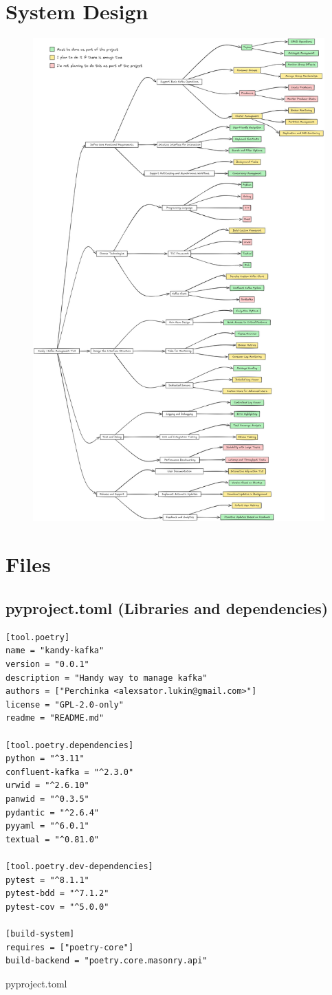 \documentclass[10pt , a4paper]{report}
\begin{document}
\chapter{System Design}\label{appendix:system_design}
\begin{figure}[htpb]
    \centering
    \includegraphics[width=0.7\linewidth]{imgs/SystemDesign.png}
\end{figure}

\chapter{Files}
\section{pyproject.toml (Libraries and dependencies)}\label{appendix:libs}
\begin{listing}[htbp]
    \begin{verbatim}
[tool.poetry]
name = "kandy-kafka"
version = "0.0.1"
description = "Handy way to manage kafka"
authors = ["Perchinka <alexsator.lukin@gmail.com>"]
license = "GPL-2.0-only"
readme = "README.md"

[tool.poetry.dependencies]
python = "^3.11"
confluent-kafka = "^2.3.0"
urwid = "^2.6.10"
panwid = "^0.3.5"
pydantic = "^2.6.4"
pyyaml = "^6.0.1"
textual = "^0.81.0"

[tool.poetry.dev-dependencies]
pytest = "^8.1.1"
pytest-bdd = "^7.1.2"
pytest-cov = "^5.0.0"

[build-system]
requires = ["poetry-core"]
build-backend = "poetry.core.masonry.api"
    \end{verbatim}
    \caption{pyproject.toml}
\end{listing}
\end{document}
